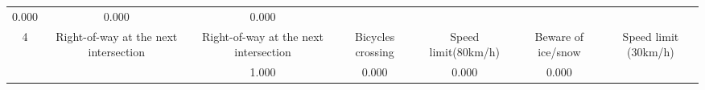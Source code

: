 \documentclass[11pt]{article}
\begin{document}
\begin{longtable}[]{@{}ccccccc@{}}
\begin{minipage}[t]{0.04\columnwidth}
0.000\strut
\end{minipage} & \begin{minipage}[t]{0.04\columnwidth}\centering\strut
0.000\strut
\end{minipage} & \begin{minipage}[t]{0.04\columnwidth}\centering\strut
0.000\strut
\end{minipage}\tabularnewline
\begin{minipage}[t]{0.04\columnwidth}\centering\strut
4\strut
\end{minipage} & \begin{minipage}[t]{0.04\columnwidth}\centering\strut
Right-of-way at the next intersection\strut
\end{minipage} & \begin{minipage}[t]{0.04\columnwidth}\centering\strut
Right-of-way at the next intersection\strut
\end{minipage} & \begin{minipage}[t]{0.04\columnwidth}\centering\strut
Bicycles crossing\strut
\end{minipage} & \begin{minipage}[t]{0.04\columnwidth}\centering\strut
Speed limit(80km/h)\strut
\end{minipage} & \begin{minipage}[t]{0.04\columnwidth}\centering\strut
Beware of ice/snow\strut
\end{minipage} & \begin{minipage}[t]{0.04\columnwidth}\centering\strut
Speed limit (30km/h)\strut
\end{minipage}\tabularnewline
\begin{minipage}[t]{0.04\columnwidth}\centering\strut
\strut
\end{minipage} & \begin{minipage}[t]{0.04\columnwidth}\centering\strut
\strut
\end{minipage} & \begin{minipage}[t]{0.04\columnwidth}\centering\strut
1.000\strut
\end{minipage} & \begin{minipage}[t]{0.04\columnwidth}\centering\strut
0.000\strut
\end{minipage} & \begin{minipage}[t]{0.04\columnwidth}\centering\strut
0.000\strut
\end{minipage} & \begin{minipage}[t]{0.04\columnwidth}\centering\strut
0.000\strut
\end{minipage} & \begin{minipage}[t]{0.04\columnwidth}\centering\strut

\end{minipage}
\end{longtable}
\end{document}
